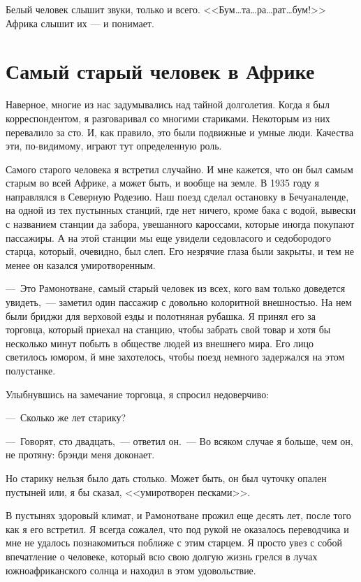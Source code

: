 \documentclass[12pt,a4paper,twoside,openany,svgnames]{memoir}
\begin{document}
Белый человек слышит звуки, только и всего. <<Бум\ldots та\ldots ра\ldots рат\ldots бум!>> Африка слышит их --- и понимает.

\chapter{Самый старый человек в Африке}

Наверное, многие из нас задумывались над тайной долголетия. Когда я был корреспондентом, я разговаривал со многими стариками. Некоторым из них перевалило за сто. И, как правило, это были подвижные и умные люди. Качества эти, по-видимому, играют тут определенную роль.

Самого старого человека я встретил случайно. И мне кажется, что он был самым старым во всей Африке, а может быть, и вообще на земле. В 1935 году я направлялся в Северную Родезию. Наш поезд сделал остановку в Бечуаналенде, на одной из тех пустынных станций, где нет ничего, кроме бака с водой, вывески с названием станции да забора, увешанного кароссами, которые иногда покупают пассажиры. А на этой станции мы еще увидели седовласого и седобородого старца, который, очевидно, был слеп. Его незрячие глаза были закрыты, и тем не менее он казался умиротворенным.

---~Это Рамонотване, самый старый человек из всех, кого вам только доведется увидеть,~--- заметил один пассажир с довольно колоритной внешностью. На нем были бриджи для верховой езды и полотняная рубашка. Я принял его за торговца, который приехал на станцию, чтобы забрать свой товар и хотя бы несколько минут побыть в обществе людей из внешнего мира. Его лицо светилось юмором, й мне захотелось, чтобы поезд немного задержался на этом полустанке.

Улыбнувшись на замечание торговца, я спросил недоверчиво:

---~Сколько же лет старику?

---~Говорят, сто двадцать,~--- ответил он.~--- Во всяком случае я больше, чем он, не протяну: брэнди меня доконает.

Но старику нельзя было дать столько. Может быть, он был чуточку опален пустыней или, я бы сказал, <<умиротворен песками>>.

В пустынях здоровый климат, и Рамонотване прожил еще десять лет, после того как я его встретил. Я всегда сожалел, что под рукой не оказалось переводчика и мне не удалось познакомиться поближе с этим старцем. Я просто увез с собой впечатление о человеке, который всю свою долгую жизнь грелся в лучах южноафриканского солнца и находил в этом удовольствие.
\end{document}
